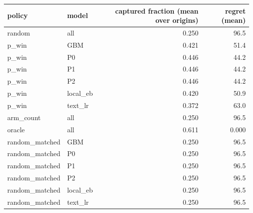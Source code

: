 \begin{tabular}{llrr}
\toprule
policy & model & captured fraction (mean over origins) & regret (mean) \\
\midrule
random & all & 0.250 & 96.5 \\
p\_win & GBM & 0.421 & 51.4 \\
p\_win & P0 & 0.446 & 44.2 \\
p\_win & P1 & 0.446 & 44.2 \\
p\_win & P2 & 0.446 & 44.2 \\
p\_win & local\_eb & 0.420 & 50.9 \\
p\_win & text\_lr & 0.372 & 63.0 \\
arm\_count & all & 0.250 & 96.5 \\
oracle & all & 0.611 & 0.000 \\
random\_matched & GBM & 0.250 & 96.5 \\
random\_matched & P0 & 0.250 & 96.5 \\
random\_matched & P1 & 0.250 & 96.5 \\
random\_matched & P2 & 0.250 & 96.5 \\
random\_matched & local\_eb & 0.250 & 96.5 \\
random\_matched & text\_lr & 0.250 & 96.5 \\
\bottomrule
\end{tabular}
